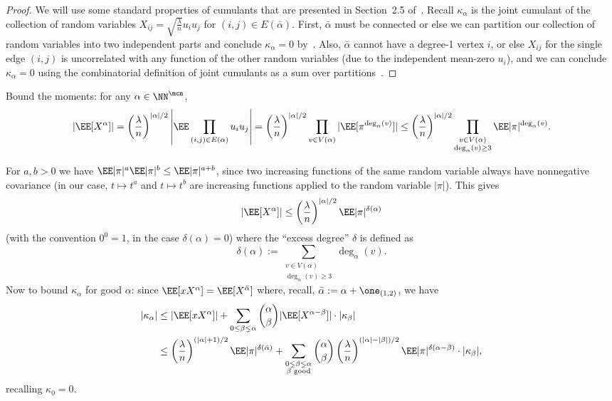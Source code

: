 \documentclass[11pt]{article}
\begin{document}
\begin{proof}
We will use some standard properties of cumulants that are presented in Section~2.5 of~\cite{SW-estimation}. Recall $\kappa_\alpha$ is the joint cumulant of the collection of random variables $X_{ij} = \sqrt{\frac{\lambda}{n}} u_i u_j$ for $(i,j) \in E(\bar\alpha)$. First, $\bar\alpha$ must be connected or else we can partition our collection of random variables into two independent parts and conclude $\kappa_\alpha = 0$ by~\cite[Proposition~2.11]{SW-estimation}. Also, $\bar\alpha$ cannot have a degree-1 vertex $i$, or else $X_{ij}$ for the single edge $(i,j)$ is uncorrelated with any function of the other random variables (due to the independent mean-zero $u_i$), and we can conclude $\kappa_\alpha = 0$ using the combinatorial definition of joint cumulants as a sum over partitions~\cite[Definition~2.10]{SW-estimation}.
\end{proof}

Bound the moments: for any $\alpha \in \NN^{\mcn}$,
\[ |\EE[X^\alpha]| = \left(\frac{\lambda}{n}\right)^{|\alpha|/2} \left|\EE\prod_{(i,j) \in E(\alpha)} u_i u_j\right| = \left(\frac{\lambda}{n}\right)^{|\alpha|/2} \prod_{v \in V(\alpha)} |\EE[\pi^{\deg_\alpha(v)}]| \le \left(\frac{\lambda}{n}\right)^{|\alpha|/2} \prod_{\substack{v \in V(\alpha) \\ \deg_\alpha(v) \ge 3}} \EE|\pi|^{\deg_\alpha(v)}. \]

\noindent For $a,b > 0$ we have $\EE|\pi|^a \EE|\pi|^b \le \EE|\pi|^{a+b}$, since two increasing functions of the same random variable always have nonnegative covariance (in our case, $t \mapsto t^a$ and $t \mapsto t^b$ are increasing functions applied to the random variable $|\pi|$). This gives
\[ |\EE[X^\alpha]| \le \left(\frac{\lambda}{n}\right)^{|\alpha|/2} \EE|\pi|^{\delta(\alpha)} \]
(with the convention $0^0 = 1$, in the case $\delta(\alpha) = 0$) where the ``excess degree'' $\delta$ is defined as
\[ \delta(\alpha) := \sum_{\substack{v \in V(\alpha) \\ \deg_\alpha(v) \ge 3}} \deg_\alpha(v). \]
Now to bound $\kappa_\alpha$ for good $\alpha$: since $\EE[xX^\alpha] = \EE[X^{\bar\alpha}]$ where, recall, $\bar\alpha := \alpha + \one_{(1,2)}$, we have
\begin{align}
|\kappa_\alpha| &\le |\EE[x X^\alpha]| + \sum_{0 \le \beta \lneq \alpha} \binom{\alpha}{\beta} |\EE[X^{\alpha-\beta}]| \cdot |\kappa_\beta| \nonumber \\
&\le \left(\frac{\lambda}{n}\right)^{(|\alpha|+1)/2} \EE|\pi|^{\delta(\bar\alpha)} + \sum_{\substack{0 \lneq \beta \lneq \alpha \\ \beta\text{ good}}} \binom{\alpha}{\beta} \left(\frac{\lambda}{n}\right)^{(|\alpha|-|\beta|)/2} \EE|\pi|^{\delta(\alpha-\beta)} \cdot |\kappa_\beta|,
\label{eq:kappa-recursion}
\end{align}
recalling $\kappa_0 = 0$.
\end{document}
